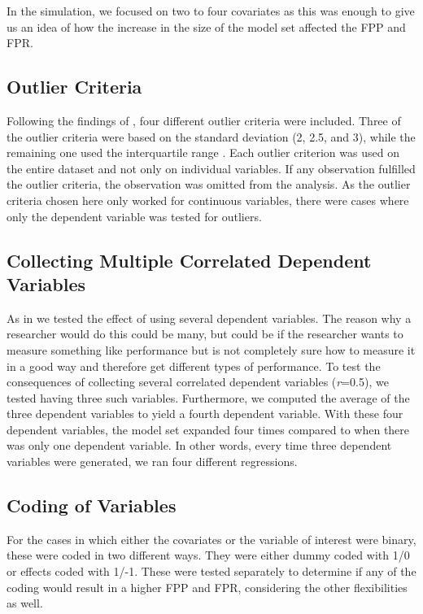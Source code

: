 In the simulation, we focused on two to four covariates as this was enough to give us an idea of how the increase in the size of the model set affected the FPP and FPR. 

\subsection{Outlier Criteria}
Following the findings of \cite{Leyes2013}, four different outlier criteria were included. Three of the outlier criteria were based on the standard deviation (2, 2.5, and 3), while the remaining one used the interquartile range \citep{Rousseeuw2011}. Each outlier criterion was used on the entire dataset and not only on individual variables. If any observation fulfilled the outlier criteria, the observation was omitted from the analysis. As the outlier criteria chosen here only worked for continuous variables, there were cases where only the dependent variable was tested for outliers.

\subsection{Collecting Multiple Correlated Dependent Variables}
As in \cite{Simmons2011} we tested the effect of using several dependent variables. The reason why a researcher would do this could be many, but could be if the researcher wants to measure something like performance but is not completely sure how to measure it in a good way and therefore get different types of performance. To test the consequences of collecting several correlated dependent variables (\textit{r}=0.5), we tested having three such variables. Furthermore, we computed the average of the three dependent variables to yield a fourth dependent variable. With these four dependent variables, the model set expanded four times compared to when there was only one dependent variable. In other words, every time three dependent variables were generated, we ran four different regressions. 

\subsection{Coding of Variables}
For the cases in which either the covariates or the variable of interest were binary, these were coded in two different ways. They were either dummy coded with 1/0 or effects coded with 1/-1. These were tested separately to determine if any of the coding would result in a higher FPP and FPR, considering the other flexibilities as well. 

